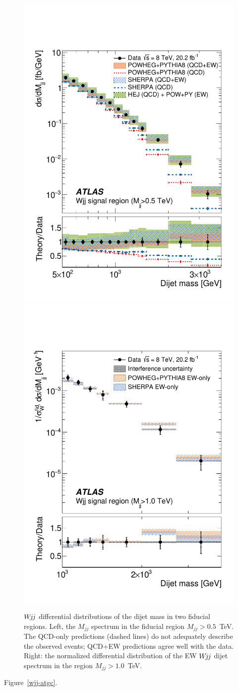 \documentclass{PoS}
\def\wjj{\ensuremath{W\kern -0.2em j\kern -0.1emj}\xspace}
\def\mjj{\ensuremath{M_{jj}}}
\begin{document}
\begin{figure}
\centering
\includegraphics[width=.49\textwidth]{STDM-2014-11/fig_16a.pdf}
\includegraphics[width=.49\textwidth]{STDM-2014-11/fig_19b.pdf}
  \caption{\wjj differential distributions of the dijet mass in two fiducial regions. Left, the $\mjj$
    spectrum in the fiducial region $\mjj>0.5$~TeV. The QCD-only predictions (dashed lines) do not
    adequately describe the observed events; QCD+EW predictions agree well with the data.
    Right: the normalized differential distribution of the EW \wjj dijet spectrum in the region
    $\mjj>1.0$~TeV.
  }
  \label{wjj-differential-distributions}
\end{figure}

Figure~\ref{wjj-atgc}.

\end{document}
